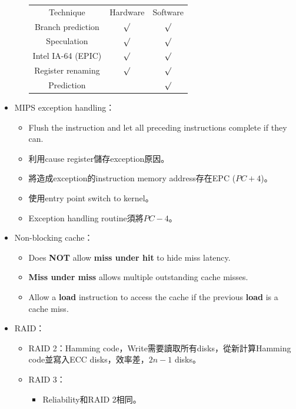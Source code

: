 \begin{itemize}
\begin{itemize}
\begin{table}[H]
\begin{tabular}{|c|c|c|}
                Technique & Hardware & Software \\
                \Xhline{2\arrayrulewidth}
                Branch prediction & $\surd$ & $\surd$ \\
                \hline
                Speculation & $\surd$ & $\surd$ \\
                \hline
                Intel IA-64 (EPIC) & $\surd$ & $\surd$ \\
                \hline
                Register renaming & $\surd$ & $\surd$ \\
                \hline
                Prediction & & $\surd$ \\
                \hline
            \end{tabular}
        \end{table}
    \end{itemize}
    \item MIPS exception handling： \begin{itemize}
        \item Flush the instruction and let all preceding instructions complete if they can.
        \item 利用cause register儲存exception原因。
        \item 將造成exception的instruction memory address存在EPC ($PC + 4$)。
        \item 使用entry point switch to kernel。
        \item Exception handling routine須將$PC - 4$。
    \end{itemize}
    \item Non-blocking cache： \begin{itemize}
        \item Does \textbf{NOT} allow \textbf{miss under hit} to hide miss latency. 
        \item \textbf{Miss under miss} allows multiple outstanding cache misses.
        \item Allow a \textbf{load} instruction to access the cache if the previous \textbf{load} is a cache miss.
    \end{itemize}
    \item RAID：\begin{itemize}
        \item RAID 2：Hamming code，Write需要讀取所有disks，從新計算Hamming code並寫入ECC disks，效率差，$2n - 1$ disks。
        \item RAID 3：\begin{itemize}
            \item Reliability和RAID 2相同。

\end{itemize}
\end{itemize}
\end{itemize}
